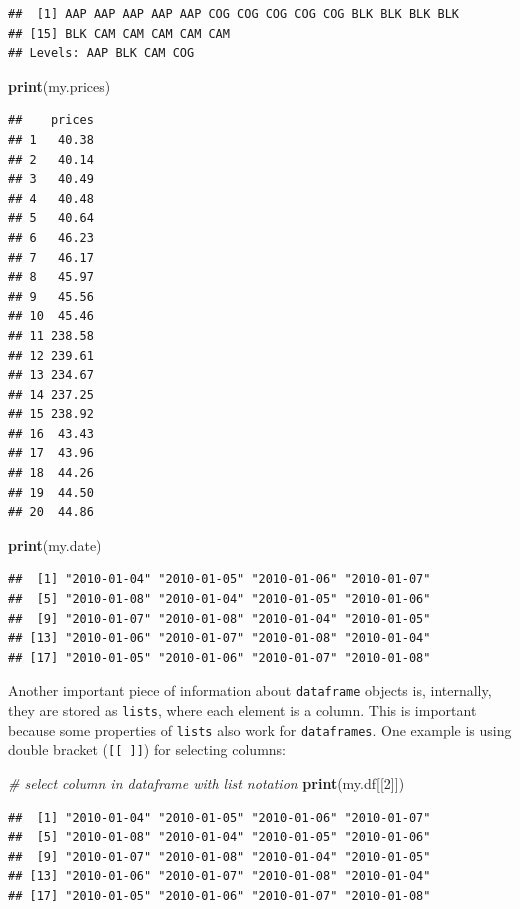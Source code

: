 \documentclass[11pt,]{book}
\newenvironment{Shaded}{\begin{snugshade}}{\end{snugshade}}
\newcommand{\KeywordTok}[1]{\textcolor[rgb]{0.27,0.27,0.27}{\textbf{#1}}}
\newcommand{\DecValTok}[1]{\textcolor[rgb]{0.06,0.06,0.06}{#1}}
\newcommand{\CommentTok}[1]{\textcolor[rgb]{0.56,0.35,0.01}{\textit{#1}}}
\newcommand{\NormalTok}[1]{#1}
\begin{document}
\begin{verbatim}
##  [1] AAP AAP AAP AAP AAP COG COG COG COG COG BLK BLK BLK BLK
## [15] BLK CAM CAM CAM CAM CAM
## Levels: AAP BLK CAM COG
\end{verbatim}

\begin{Shaded}
\begin{Highlighting}[]
\KeywordTok{print}\NormalTok{(my.prices)}
\end{Highlighting}
\end{Shaded}

\begin{verbatim}
##    prices
## 1   40.38
## 2   40.14
## 3   40.49
## 4   40.48
## 5   40.64
## 6   46.23
## 7   46.17
## 8   45.97
## 9   45.56
## 10  45.46
## 11 238.58
## 12 239.61
## 13 234.67
## 14 237.25
## 15 238.92
## 16  43.43
## 17  43.96
## 18  44.26
## 19  44.50
## 20  44.86
\end{verbatim}

\begin{Shaded}
\begin{Highlighting}[]
\KeywordTok{print}\NormalTok{(my.date)}
\end{Highlighting}
\end{Shaded}

\begin{verbatim}
##  [1] "2010-01-04" "2010-01-05" "2010-01-06" "2010-01-07"
##  [5] "2010-01-08" "2010-01-04" "2010-01-05" "2010-01-06"
##  [9] "2010-01-07" "2010-01-08" "2010-01-04" "2010-01-05"
## [13] "2010-01-06" "2010-01-07" "2010-01-08" "2010-01-04"
## [17] "2010-01-05" "2010-01-06" "2010-01-07" "2010-01-08"
\end{verbatim}

Another important piece of information about \texttt{dataframe} objects
is, internally, they are stored as \texttt{lists}, where each element is
a column. This is important because some properties of \texttt{lists}
also work for \texttt{dataframes}. One example is using double bracket
(\texttt{{[}{[}\ {]}{]}}) for selecting columns:

\begin{Shaded}
\begin{Highlighting}[]
\CommentTok{# select column in dataframe with list notation}
\KeywordTok{print}\NormalTok{(my.df[[}\DecValTok{2}\NormalTok{]])}
\end{Highlighting}
\end{Shaded}

\begin{verbatim}
##  [1] "2010-01-04" "2010-01-05" "2010-01-06" "2010-01-07"
##  [5] "2010-01-08" "2010-01-04" "2010-01-05" "2010-01-06"
##  [9] "2010-01-07" "2010-01-08" "2010-01-04" "2010-01-05"
## [13] "2010-01-06" "2010-01-07" "2010-01-08" "2010-01-04"
## [17] "2010-01-05" "2010-01-06" "2010-01-07" "2010-01-08"
\end{verbatim}
\end{document}
